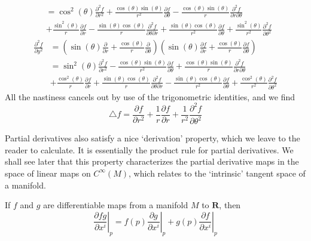 \begin{example}
\begin{align*}
        &= \cos^2(\theta) \frac{\partial^2 f}{\partial r^2} + \frac{\cos(\theta) \sin(\theta)}{r^2} \frac{\partial f}{\partial \theta} - \frac{\cos(\theta) \sin(\theta)}{r} \frac{\partial^2 f}{\partial r \partial \theta}\\
        &+ \frac{\sin^2(\theta)}{r} \frac{\partial f}{\partial r} - \frac{\sin(\theta) \cos(\theta)}{r} \frac{\partial^2 f}{\partial \theta \partial r} + \frac{\sin(\theta) \cos(\theta)}{r^2} \frac{\partial f}{\partial \theta} + \frac{\sin^2(\theta)}{r^2} \frac{\partial^2 f}{\partial \theta^2}
    \end{align*}
    \begin{align*}
        \frac{\partial^2 f}{\partial y^2} &= \left( \sin(\theta) \frac{\partial}{\partial r} + \frac{\cos(\theta)}{r} \frac{\partial}{\partial \theta} \right) \left( \sin(\theta) \frac{\partial f}{\partial r} + \frac{\cos(\theta)}{r} \frac{\partial f}{\partial \theta} \right)\\
        &= \sin^2(\theta) \frac{\partial^2 f}{\partial r^2} - \frac{\cos(\theta) \sin(\theta)}{r^2} \frac{\partial f}{\partial \theta} + \frac{\cos(\theta) \sin(\theta)}{r} \frac{\partial^2 f}{\partial r \partial \theta}\\
        &+ \frac{\cos^2(\theta)}{r} \frac{\partial f}{\partial r} + \frac{\sin(\theta) \cos(\theta)}{r} \frac{\partial^2 f}{\partial \theta \partial r} - \frac{\sin(\theta) \cos(\theta)}{r^2} \frac{\partial f}{\partial \theta} + \frac{\cos^2(\theta)}{r^2} \frac{\partial^2 f}{\partial \theta^2}
    \end{align*}
    All the nastiness cancels out by use of the trigonometric identities, and we find
    \[ \bigtriangleup f = \frac{\partial f}{\partial r^2} + \frac{1}{r} \frac{\partial f}{\partial r} + \frac{1}{r^2} \frac{\partial^2 f}{\partial \theta^2} \]
\end{example}

Partial derivatives also satisfy a nice `derivation' property, which we leave to the reader to calculate. It is essentially the product rule for partial derivatives. We shall see later that this property characterizes the partial derivative maps in the space of linear maps on $C^\infty(M)$, which relates to the `intrinsic' tangent space of a manifold.

\begin{lemma}
    If $f$ and $g$ are differentiable maps from a manifold $M$ to $\mathbf{R}$, then
    \[ \left.\frac{\partial fg}{\partial x^i}\right|_p = f(p)\left.\frac{\partial g}{\partial x^i}\right|_p + g(p)\left.\frac{\partial f}{\partial x^i}\right|_p  \]
\end{lemma}


